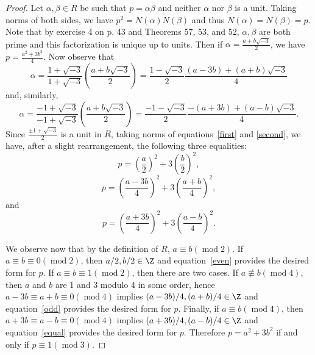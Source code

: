 \documentclass[10pt]{amsart}
\begin{document}
\begin{ex3}
\begin{proof}
    Let $\alpha, \beta \in R$ be such that $p = \alpha\beta$ and neither $\alpha$ nor $\beta$ is a unit.
    Taking norms of both sides, we have $p^2 = N(\alpha)N(\beta)$ and thus $N(\alpha) = N(\beta) = p$.
    Note that by exercise 4 on p. 43 and Theorems 57, 53, and 52, $\alpha, \beta$ are both prime and this factorization is unique up to units.
    Then if $\alpha = \frac{a + b\sqrt{-3}}{2}$, we have $p = \frac{a^2 + 3b^2}{4}$.
    Now observe that 
    \begin{equation}\label{first}
      \alpha = \frac{1 + \sqrt{-3}}{1 + \sqrt{-3}}\left(\frac{a + b\sqrt{-3}}{2}\right) = \frac{1 - \sqrt{-3}}{2}\frac{(a - 3b) + (a + b)\sqrt{-3}}{4}
    \end{equation}
    and, similarly,
    \begin{equation}\label{second}
      \alpha = \frac{-1 + \sqrt{-3}}{-1 + \sqrt{-3}}\left(\frac{a + b\sqrt{-3}}{2}\right) = \frac{-1 - \sqrt{-3}}{2}\frac{-(a + 3b) + (a - b)\sqrt{-3}}{4}.
    \end{equation}
    Since $\frac{\pm1 + \sqrt{-3}}{2}$ is a unit in $R$, taking norms of equations~\eqref{first} and \eqref{second}, we have, after a slight rearrangement, the following three equalities:
    \begin{equation}\label{even}
      p = \left(\frac{a}{2}\right)^2 + 3\left(\frac{b}{2}\right)^2,
    \end{equation}
    \begin{equation}\label{odd}
      p = \left(\frac{a - 3b}{4}\right)^2 + 3\left(\frac{a + b}{4}\right)^2,
    \end{equation}
    and
    \begin{equation}\label{equal}
      p = \left(\frac{a + 3b}{4}\right)^2 + 3\left(\frac{a - b}{4}\right)^2.
    \end{equation}

    We observe now that by the definition of $R$, $a \equiv b (\operatorname{mod} 2)$.
    If $a \equiv b \equiv 0 (\operatorname{mod} 2)$, then $a/2, b/2 \in \Z$ and equation~\eqref{even} provides the desired form for $p$.
    If $a \equiv b \equiv 1(\operatorname{mod} 2)$, then there are two cases.
    If $a \not \equiv b (\operatorname{mod} 4)$, then $a$ and $b$ are 1 and 3 modulo 4 in some order, hence $a - 3b \equiv a + b \equiv 0 (\operatorname{mod} 4)$ implies $(a - 3b)/4, (a + b)/4 \in \Z$ and equation~\eqref{odd} provides the desired form for $p$.
    Finally, if $a \equiv b (\operatorname{mod} 4)$, then $a + 3b \equiv a - b \equiv 0 (\operatorname{mod} 4)$ implies $(a + 3b)/4, (a-b)/4 \in \Z$ and equation~\eqref{equal} provides the desired form for $p$.
    Therefore $p = a^2 + 3b^2$ if and only if $p \equiv 1 (\operatorname{mod} 3)$.
  \end{proof}
\end{ex3}
\end{document}
